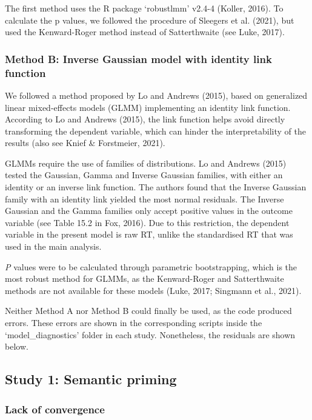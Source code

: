 \documentclass[
  12pt,
  man,floatsintext]{apa7}
\begin{document}
The first method uses the R package `robustlmm' v2.4-4 (Koller, 2016). To calculate the p values, we followed the procedure of Sleegers et al. (2021), but used the Kenward-Roger method instead of Satterthwaite (see Luke, 2017).

\hypertarget{method-b-inverse-gaussian-model-with-identity-link-function}{%
\subsubsection{Method B: Inverse Gaussian model with identity link function}\label{method-b-inverse-gaussian-model-with-identity-link-function}}

We followed a method proposed by Lo and Andrews (2015), based on generalized linear mixed-effects models (GLMM) implementing an identity link function. According to Lo and Andrews (2015), the link function helps avoid directly transforming the dependent variable, which can hinder the interpretability of the results (also see Knief \& Forstmeier, 2021).

GLMMs require the use of families of distributions. Lo and Andrews (2015) tested the Gaussian, Gamma and Inverse Gaussian families, with either an identity or an inverse link function. The authors found that the Inverse Gaussian family with an identity link yielded the most normal residuals. The Inverse Gaussian and the Gamma families only accept positive values in the outcome variable (see Table 15.2 in Fox, 2016). Due to this restriction, the dependent variable in the present model is raw RT, unlike the standardised RT that was used in the main analysis.

\emph{P} values were to be calculated through parametric bootstrapping, which is the most robust method for GLMMs, as the Kenward-Roger and Satterthwaite methods are not available for these models (Luke, 2017; Singmann et al., 2021).

Neither Method A nor Method B could finally be used, as the code produced errors. These errors are shown in the corresponding scripts inside the `model\_diagnostics' folder in each study. Nonetheless, the residuals are shown below.

\hypertarget{study-1-semantic-priming-2}{%
\subsection{Study 1: Semantic priming}\label{study-1-semantic-priming-2}}

\hypertarget{lack-of-convergence-1}{%
\subsubsection{Lack of convergence}\label{lack-of-convergence-1}}
\end{document}
